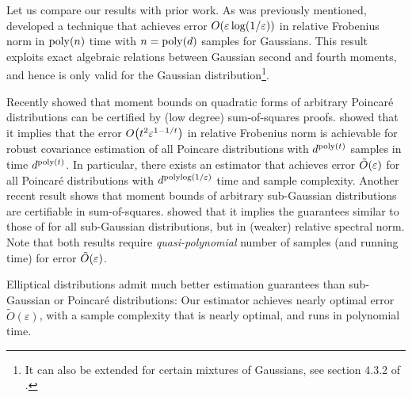 Let us compare our results with prior work. As was previously mentioned, \cite{DiakonikolasKK016} developed a technique that achieves error $O(\varepsilon\log(1/\varepsilon))$ in relative Frobenius norm in $\operatorname{poly}(n)$ time with $n=\operatorname{poly}(d)$ samples for Gaussians.
This result exploits exact algebraic relations between Gaussian second and fourth moments, and hence is only valid for the Gaussian distribution\footnote{It can also be extended for certain mixtures of Gaussians, see section 4.3.2 of \cite{DK_book}.}.


Recently \cite{sos-poincare} showed that moment bounds on quadratic forms of arbitrary Poincar\'e distributions can be certified by (low degree) sum-of-squares proofs. \cite{Bakshi} showed that it implies that the error $O\Paren{t^2\e^{1-1/t}}$ in relative Frobenius norm is achievable for robust covariance estimation of all Poincare distributions with $d^{\operatorname{poly}(t)}$ samples in time $d^{\operatorname{poly}(t)}$. In particular, there exists an estimator that achieves error $\tilde{O}(\varepsilon)$ for all Poincar\'e distributions with $d^{\operatorname{polylog}(1/\varepsilon)}$ time and sample complexity.
Another recent result \cite{sos-subgaussian} shows that moment bounds of arbitrary sub-Gaussian distributions are certifiable in sum-of-squares. \cite{KS17} showed that it implies the guarantees similar to those of \cite{Bakshi} for all sub-Gaussian distributions, but in (weaker) relative spectral norm. Note that both results require \emph{quasi-polynomial} number of samples (and running time) for error $\tilde{O}(\varepsilon)$. 

Elliptical distributions admit much better estimation guarantees than sub-Gaussian or Poincaré distributions: Our estimator achieves nearly optimal error $\tilde{O}(\varepsilon)$, with a sample complexity that is nearly optimal, and runs in polynomial time.



    


